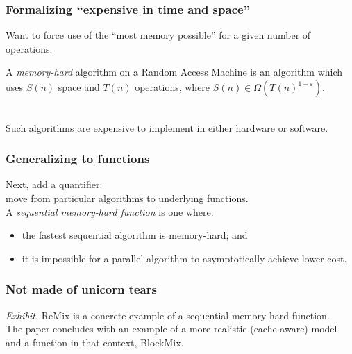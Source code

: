 \begin{frame}
  \frametitle{Formalizing ``expensive in time and space''}
  
    Want to force use of the ``most memory possible'' for a given
    number of operations.\\[1em]
  
    \begin{defn}
      A \emph{memory-hard} algorithm on a Random Access Machine is an
      algorithm which uses $S(n)$ space and $T(n)$ operations, where
      $S(n) \in \Omega(T(n)^{1-\varepsilon})$.
    \end{defn}~\\
    
      Such algorithms are expensive to implement in either hardware or software.
    

\end{frame}

\begin{frame}
  \frametitle{Generalizing to functions}
  
    Next, add a quantifier: \\move from particular algorithms to underlying functions.\\[1em]
    A \emph{sequential memory-hard function} is one where:

    \begin{itemize}
      \item the fastest
        sequential algorithm is memory-hard; and
      \item it is impossible for a
        parallel algorithm to asymptotically achieve lower cost.
    \end{itemize}
  
\end{frame}

\begin{frame}
  \frametitle{Not made of unicorn tears}
  
    \emph{Exhibit.} ReMix is a concrete example of a sequential memory hard function.\\[1em]
    The paper concludes with an example of a more realistic (cache-aware) model and
    a function in that context, BlockMix.
  
\end{frame}


